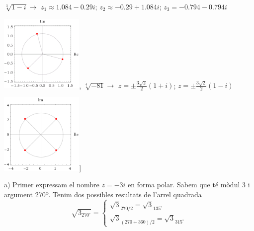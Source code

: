 \begin{mylist}
{	 $\sqrt[3]{1-i}\rightarrow$ $z_1\approx 1.084-0.29i$; $z_2 \approx -0.29 +1.084i$; $z_3=-0.794-0.794i$ \par \includegraphics[width=0.3\textwidth]{img-sol/t4-15e}, 
	 $\sqrt[4]{-81}\rightarrow$ $z=\pm \frac{3\sqrt{2}}{2}(1+i)$; $z=\pm \frac{3\sqrt{2}}{2}(1-i)$\par \includegraphics[width=0.3\textwidth]{img-sol/t4-15f}]}
\end{mylist}

\begin{example}
	a) Primer expressam el nombre $z=-3i$ en forma polar. Sabem que té mòdul 3 i argument 270º. Tenim dos possibles resultats de l'arrel quadrada
	\begin{equation*}
		\sqrt{3_{270^\circ}} = \left\{ 
		\begin{array}{l}
			\sqrt{3}_{270/2} = \sqrt{3}_{135^\circ} \\
			\sqrt{3}_{(270+360)/2} = \sqrt{3}_{315^\circ}
		\end{array}
		 \right.
	\end{equation*}
\end{example}


